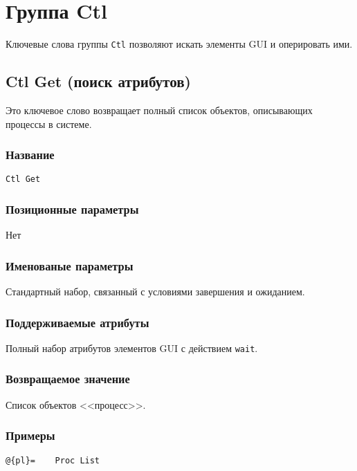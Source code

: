 \documentclass[11pt]{book} %
\begin{document}
\section{Группа Ctl}
Ключевые слова группы \verb"Ctl" позволяют искать элементы GUI и оперировать ими.

\subsection{Ctl Get (поиск атрибутов)}
Это ключевое слово возвращает полный список объектов, описывающих процессы в системе.


\subsubsection*{Название} 
\verb"Ctl Get"

\subsubsection*{Позиционные параметры} 
Нет

\subsubsection*{Именованые параметры}

Стандартный набор, связанный с условиями завершения и ожиданием.

\subsubsection*{Поддерживаемые атрибуты} 

Полный набор атрибутов элементов GUI с действием \verb|wait|.

\subsubsection*{Возвращаемое значение} 
Список объектов <<процесс>>.

\subsubsection*{Примеры}
\begin{verbatim}@{pl}=    Proc List\end{verbatim}
\end{document}
